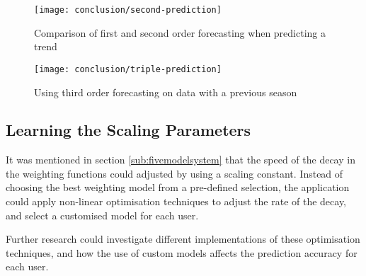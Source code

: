 \begin{figure}
\centering
\texttt{[image: conclusion/second-prediction]}
\caption{Comparison of first and second order forecasting when predicting a trend}
\label{fig:prediction-second}
\end{figure}

\begin{figure}
\centering
\texttt{[image: conclusion/triple-prediction]}
\caption{Using third order forecasting on data with a previous season}
\label{fig:prediction-third}
\end{figure}

\subsection{Learning the Scaling Parameters}
\label{section:learningscalingparameter}
It was mentioned in section \ref{sub:fivemodelsystem} that the speed of the decay in the weighting functions could adjusted by using a scaling constant. Instead of choosing the best weighting model from a pre-defined selection, the application could apply non-linear optimisation techniques to adjust the rate of the decay, and select a customised model for each user. 

Further research could investigate different implementations of these optimisation techniques, and how the use of custom models affects the prediction accuracy for each user.

